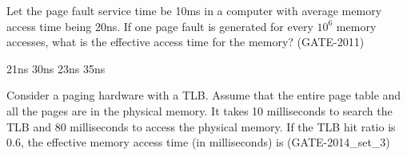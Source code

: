 
\begin{questyle}

  \question Let the page fault service time be 10ms in a computer with average memory access time being 20ns.
            If one page fault is generated for every {\large \(10^6\) }  memory accesses, what is the effective access time
            for the memory? (GATE-2011)

  \begin{choices}
    \choice 21ns
    \choice 30ns
    \choice 23ns
    \choice 35ns
  \end{choices}

\end{questyle}


\begin{questyle}

  \question  Consider a paging hardware with a TLB. Assume that the entire page table and all the pages
            are in the physical memory. It takes 10 milliseconds to search the TLB and 80 milliseconds to
            access the physical memory. If the TLB hit ratio is 0.6, the effective memory access
            time (in milliseconds) is \fillin[] (GATE-2014\_set\_3)

\end{questyle}




















